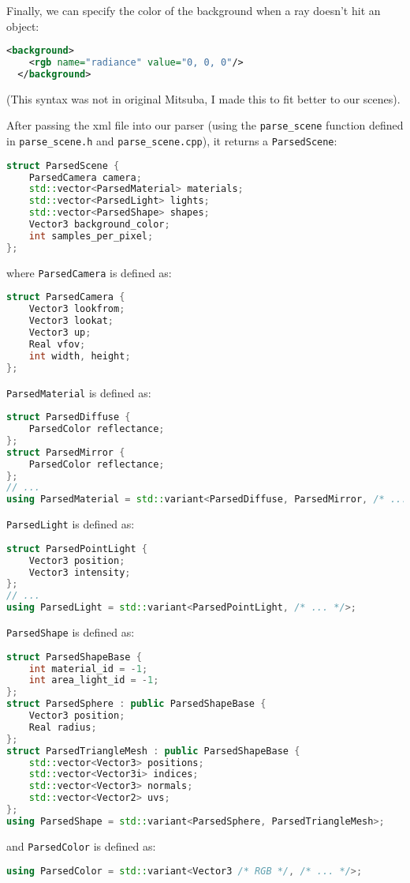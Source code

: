 Finally, we can specify the color of the background when a ray doesn't hit an object:
\begin{lstlisting}[language=xml]
  <background>
    <rgb name="radiance" value="0, 0, 0"/>
  </background>
\end{lstlisting}
(This syntax was not in original Mitsuba, I made this to fit better to our scenes).

After passing the xml file into our parser (using the \lstinline{parse_scene} function defined in \lstinline{parse_scene.h} and \lstinline{parse_scene.cpp}), it returns a \lstinline{ParsedScene}:
\begin{lstlisting}[language=C++]
struct ParsedScene {
    ParsedCamera camera;
    std::vector<ParsedMaterial> materials;
    std::vector<ParsedLight> lights;
    std::vector<ParsedShape> shapes;
    Vector3 background_color;
    int samples_per_pixel;
};
\end{lstlisting}
where \lstinline{ParsedCamera} is defined as:
\begin{lstlisting}[language=C++]
struct ParsedCamera {
    Vector3 lookfrom;
    Vector3 lookat;
    Vector3 up;
    Real vfov;
    int width, height;
};
\end{lstlisting}
\lstinline{ParsedMaterial} is defined as:
\begin{lstlisting}[language=C++]
struct ParsedDiffuse {
    ParsedColor reflectance;
};
struct ParsedMirror {
    ParsedColor reflectance;
};
// ...
using ParsedMaterial = std::variant<ParsedDiffuse, ParsedMirror, /* ... */>;
\end{lstlisting}
\lstinline{ParsedLight} is defined as:
\begin{lstlisting}[language=C++]
struct ParsedPointLight {
    Vector3 position;
    Vector3 intensity;
};
// ...
using ParsedLight = std::variant<ParsedPointLight, /* ... */>;
\end{lstlisting}
\lstinline{ParsedShape} is defined as:
\begin{lstlisting}[language=C++]
struct ParsedShapeBase {
    int material_id = -1;
    int area_light_id = -1;
};
struct ParsedSphere : public ParsedShapeBase {
    Vector3 position;
    Real radius;
};
struct ParsedTriangleMesh : public ParsedShapeBase {
    std::vector<Vector3> positions;
    std::vector<Vector3i> indices;
    std::vector<Vector3> normals;
    std::vector<Vector2> uvs;
};
using ParsedShape = std::variant<ParsedSphere, ParsedTriangleMesh>;
\end{lstlisting}
and \lstinline{ParsedColor} is defined as:
\begin{lstlisting}[language=C++]
using ParsedColor = std::variant<Vector3 /* RGB */, /* ... */>;
\end{lstlisting}

